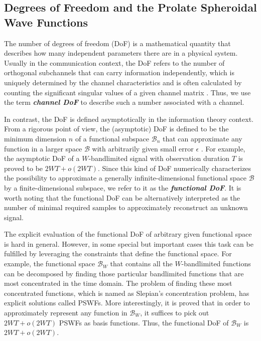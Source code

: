 \documentclass[journal,twocolumn]{IEEEtran}
\begin{document}


\subsection{Degrees of Freedom and the Prolate Spheroidal Wave Functions}
\label{Sec_2_Subsec_1}
The number of degrees of freedom (DoF) is a mathematical quantity that describes how many independent parameters there are in a physical system. 
Usually in the communication context, the DoF refers to the number of orthogonal subchannels that can carry information independently, which is uniquely determined by the channel characteristics and is often calculated by counting the significant singular values of a given channel matrix \cite{goldsmith2003capacity}. 
Thus, we use the term {\textbf{\emph{channel DoF}}} to describe such a number associated with a channel.

In contrast, the DoF is defined asymptotically in the information theory context. From a rigorous point of view, the (asymptotic) DoF is defined to be the minimum dimension $n$ of a functional subspace $\mathcal{B}_n$ that can approximate any function in a larger space $\mathcal{B}$ with arbitrarily given small error $\epsilon$ \cite{poon2005degrees}. For example, the asymptotic DoF of a $W$-bandlimited signal with observation duration $T$ is proved to be $2WT+o(2WT)$. 
Since this kind of DoF numerically characterizes the possibility to approximate a generally infinite-dimensional functional space $\mathcal{B}$ by a finite-dimensional subspace, we refer to it as the {\textbf{\emph{functional DoF}}}. 
It is worth noting that the functional DoF can be alternatively interpreted as the number of minimal required samples to approximately reconstruct an unknown signal. 

The explicit evaluation of the functional DoF of arbitrary given functional space is hard in general. However, in some special but important cases this task can be fulfilled by leveraging the constraints that define the functional space.
For example, the functional space $\mathcal{B}_W$ that contains all the $W$-bandlimited functions can be decomposed by finding those particular bandlimited functions that are most concentrated in the time domain. The problem of finding these most concentrated functions, which is named as Slepian's concentration problem, has explicit solutions called PSWFs.
More interestingly, it is proved that in order to approximately represent any function in $\mathcal{B}_W$, it suffices to pick out $2WT+o(2WT)$ PSWFs as basis functions. Thus, the functional DoF of $\mathcal{B}_W$ is $2WT+o(2WT)$. 
\end{document}
